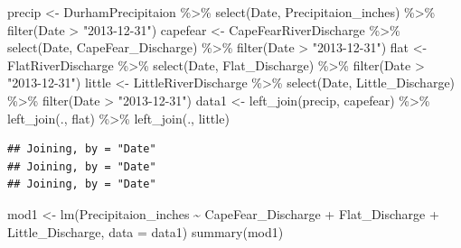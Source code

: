 \documentclass[
  12pt,
]{article}
\newenvironment{Shaded}{\begin{snugshade}}{\end{snugshade}}
\newcommand{\AttributeTok}[1]{\textcolor[rgb]{0.77,0.63,0.00}{#1}}
\newcommand{\FunctionTok}[1]{\textcolor[rgb]{0.00,0.00,0.00}{#1}}
\newcommand{\NormalTok}[1]{#1}
\newcommand{\OtherTok}[1]{\textcolor[rgb]{0.56,0.35,0.01}{#1}}
\newcommand{\SpecialCharTok}[1]{\textcolor[rgb]{0.00,0.00,0.00}{#1}}
\newcommand{\StringTok}[1]{\textcolor[rgb]{0.31,0.60,0.02}{#1}}
\begin{document}
\begin{Shaded}
\begin{Highlighting}[]
\NormalTok{precip }\OtherTok{\textless{}{-}}\NormalTok{ DurhamPrecipitaion }\SpecialCharTok{\%\textgreater{}\%}
  \FunctionTok{select}\NormalTok{(Date, Precipitaion\_inches) }\SpecialCharTok{\%\textgreater{}\%}
  \FunctionTok{filter}\NormalTok{(Date }\SpecialCharTok{\textgreater{}} \StringTok{"2013{-}12{-}31"}\NormalTok{)}
\NormalTok{capefear }\OtherTok{\textless{}{-}}\NormalTok{ CapeFearRiverDischarge }\SpecialCharTok{\%\textgreater{}\%}
  \FunctionTok{select}\NormalTok{(Date, CapeFear\_Discharge) }\SpecialCharTok{\%\textgreater{}\%}
  \FunctionTok{filter}\NormalTok{(Date }\SpecialCharTok{\textgreater{}} \StringTok{"2013{-}12{-}31"}\NormalTok{)}
\NormalTok{flat }\OtherTok{\textless{}{-}}\NormalTok{ FlatRiverDischarge }\SpecialCharTok{\%\textgreater{}\%}
  \FunctionTok{select}\NormalTok{(Date, Flat\_Discharge) }\SpecialCharTok{\%\textgreater{}\%}
  \FunctionTok{filter}\NormalTok{(Date }\SpecialCharTok{\textgreater{}} \StringTok{"2013{-}12{-}31"}\NormalTok{)}
\NormalTok{little }\OtherTok{\textless{}{-}}\NormalTok{ LittleRiverDischarge }\SpecialCharTok{\%\textgreater{}\%}
  \FunctionTok{select}\NormalTok{(Date, Little\_Discharge) }\SpecialCharTok{\%\textgreater{}\%}
  \FunctionTok{filter}\NormalTok{(Date }\SpecialCharTok{\textgreater{}} \StringTok{"2013{-}12{-}31"}\NormalTok{)}
\NormalTok{data1 }\OtherTok{\textless{}{-}} \FunctionTok{left\_join}\NormalTok{(precip, capefear) }\SpecialCharTok{\%\textgreater{}\%}
  \FunctionTok{left\_join}\NormalTok{(., flat) }\SpecialCharTok{\%\textgreater{}\%}
  \FunctionTok{left\_join}\NormalTok{(., little) }
\end{Highlighting}
\end{Shaded}

\begin{verbatim}
## Joining, by = "Date"
## Joining, by = "Date"
## Joining, by = "Date"
\end{verbatim}

\begin{Shaded}
\begin{Highlighting}[]
\NormalTok{mod1 }\OtherTok{\textless{}{-}} \FunctionTok{lm}\NormalTok{(Precipitaion\_inches }\SpecialCharTok{\textasciitilde{}}\NormalTok{ CapeFear\_Discharge }\SpecialCharTok{+}\NormalTok{ Flat\_Discharge }\SpecialCharTok{+} 
\NormalTok{             Little\_Discharge, }\AttributeTok{data =}\NormalTok{ data1)}
\FunctionTok{summary}\NormalTok{(mod1)}
\end{Highlighting}
\end{Shaded}
\end{document}
